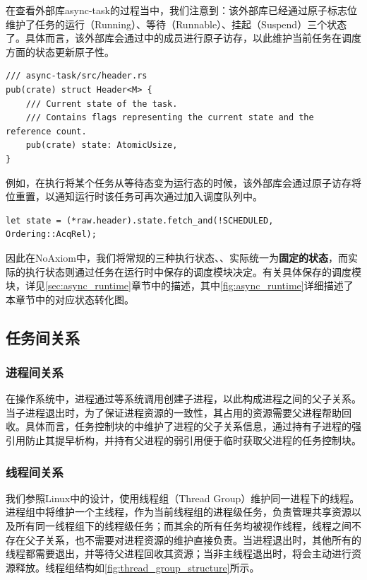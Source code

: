 \documentclass{article}
\begin{document}
在查看外部库async-task的过程当中，我们注意到：该外部库已经通过原子标志位维护了任务的运行（Running）、等待（Runnable）、挂起（Suspend）三个状态了。具体而言，该外部库会通过中的成员进行原子访存，以此维护当前任务在调度方面的状态更新原子性。

\begin{lstlisting}
/// async-task/src/header.rs
pub(crate) struct Header<M> {
    /// Current state of the task.
    /// Contains flags representing the current state and the reference count.
    pub(crate) state: AtomicUsize,
}
\end{lstlisting}

例如，在执行将某个任务从等待态变为运行态的时候，该外部库会通过原子访存将位重置，以通知运行时该任务可再次通过加入调度队列中。

\begin{lstlisting}
let state = (*raw.header).state.fetch_and(!SCHEDULED, Ordering::AcqRel);
\end{lstlisting}

因此在NoAxiom中，我们将常规的三种执行状态、、实际统一为\textbf{固定的状态}，而实际的执行状态则通过任务在运行时中保存的调度模块决定。有关具体保存的调度模块，详见\ref{sec:async_runtime}章节中的描述，其中\autoref{fig:async_runtime}详细描述了本章节中的对应状态转化图。

\subsection{任务间关系}

\subsubsection{进程间关系}

在操作系统中，进程通过等系统调用创建子进程，以此构成进程之间的父子关系。当子进程退出时，为了保证进程资源的一致性，其占用的资源需要父进程帮助回收。具体而言，任务控制块的中维护了进程的父子关系信息，通过持有子进程的强引用防止其提早析构，并持有父进程的弱引用便于临时获取父进程的任务控制块。

\subsubsection{线程间关系}

我们参照Linux中的设计，使用线程组（Thread Group）维护同一进程下的线程。进程组中将维护一个主线程，作为当前线程组的进程级任务，负责管理共享资源以及所有同一线程组下的线程级任务；而其余的所有任务均被视作线程，线程之间不存在父子关系，也不需要对进程资源的维护直接负责。当进程退出时，其他所有的线程都需要退出，并等待父进程回收其资源；当非主线程退出时，将会主动进行资源释放。线程组结构如\autoref{fig:thread_group_structure}所示。
\end{document}
